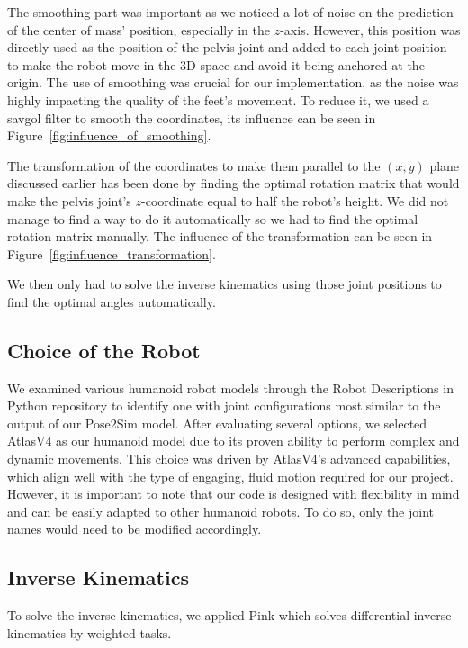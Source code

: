 \documentclass{amsart}
\theoremstyle{definition}
\theoremstyle{plain}
\begin{document}
The smoothing part was important as we noticed a lot of noise on the prediction of the center of mass' position, especially in the $z$-axis. 
However, this position was directly used as the position of the pelvis joint and added to each joint position to make the robot move in the 3D space and avoid it being anchored at the origin. 
The use of smoothing was crucial for our implementation, as the noise was highly impacting the quality of the feet's movement. To reduce it, we used a savgol filter to smooth the coordinates, its influence can be seen in Figure~\ref{fig:influence_of_smoothing}.

The transformation of the coordinates to make them parallel to the $(x, y)$ plane discussed earlier has been done by finding the optimal rotation matrix that would make the pelvis joint's $z$-coordinate equal to half the robot's height. We did not manage to find a way to do it automatically so we had to find the optimal rotation matrix manually. 
The influence of the transformation can be seen in Figure~\ref{fig:influence_transformation}.

We then only had to solve the inverse kinematics using those joint positions to find the optimal angles automatically.

\subsection{Choice of the Robot}

We examined various humanoid robot models through the Robot Descriptions in Python repository \cite{robot_descriptions_py} to identify one with joint configurations most similar to the output of our Pose2Sim model. 
After evaluating several options, we selected AtlasV4 as our humanoid model due to its proven ability to perform complex and dynamic movements. 
This choice was driven by AtlasV4's advanced capabilities, which align well with the type of engaging, fluid motion required for our project. 
However, it is important to note that our code is designed with flexibility in mind and can be easily adapted to other humanoid robots. 
To do so, only the joint names would need to be modified accordingly.


\subsection{Inverse Kinematics}
To solve the inverse kinematics, we applied Pink\cite{pink2024} which solves differential inverse kinematics by weighted tasks. 
\end{document}

